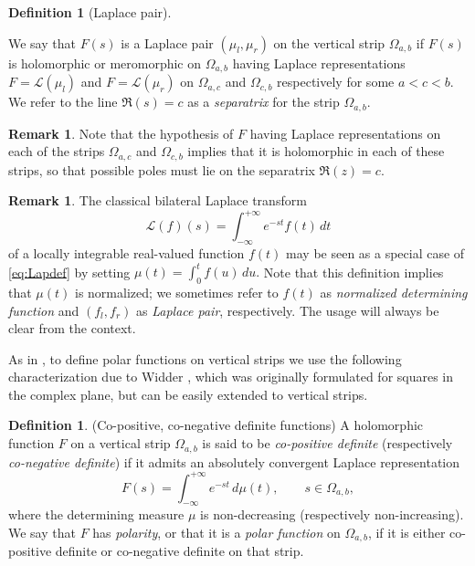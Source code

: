 \documentclass[12pt]{article}
\theoremstyle{definition}
\newtheorem{definition}[theorem]{Definition}
\newtheorem{remark}[theorem]{Remark}
\begin{document}
\begin{definition}[Laplace pair]
\label{def_Laplace_pair}

    We say that $F(s)$ is a Laplace pair $(\mu_l, \mu_r)$ on the vertical strip $\Omega_{a,b}$ if $F(s)$ is holomorphic or meromorphic on $\Omega_{a,b}$ having Laplace representations $F=\mathcal{L}(\mu_l)$ and $F=\mathcal{L}(\mu_r)$ on $\Omega_{a,c}$ and $\Omega_{c,b}$ respectively for some $a<c<b.$ We refer to the line $\Re(s)=c$ as a {\em separatrix} for the strip $\Omega_{a,b}.$
\end{definition}

\begin{remark} \label{rem_polos_na_separatriz}
Note that the hypothesis of $F$ having Laplace representations on each of the strips $\Omega_{a,c}$ and $\Omega_{c,b}$ implies that it is holomorphic in each of these strips, so that possible poles must lie on the separatrix $\Re(z)=c$.
   
\end{remark}

\begin{remark}
    The classical bilateral Laplace transform \begin{equation*}
    \mathcal{L}(f)(s)=\int_{-\infty}^{+ \infty}e^{-st}f(t) \,dt
\end{equation*} of a locally integrable  real-valued 
function $f(t)$ may be seen as a special case of \eqref{eq:Lapdef} by setting $\mu(t)= \int_{0}^{t} f(u) \, du.$ Note that this definition implies that $\mu(t)$ is normalized; we sometimes refer to $f(t)$ as {\em normalized determining function} and $(f_l, f_r)$ as {\em Laplace pair}, respectively.  The usage will always be clear from the context.
\end{remark}

As in \cite{BuescuPolar, BuescuSpecial}, to define polar functions on vertical strips we use the following characterization due to Widder
 \cite{Widder2}, which was originally formulated for squares in the complex plane, but can be easily extended to vertical strips.
\begin{definition}
\label{def_coco}
(Co-positive, co-negative definite functions) 
A holomorphic function \(F\) on a vertical strip \(\Omega_{a,b}\) is said to be \emph{co-positive definite} (respectively \emph{co-negative definite}) if it admits an absolutely convergent Laplace representation
\begin{equation}
    \label{eq_Widder}
F(s)=\int_{-\infty}^{+\infty} e^{-st}\,d\mu(t), \qquad s\in\Omega_{a,b},
\end{equation}
where the determining measure \(\mu\) is non-decreasing (respectively non-increasing). We say that \(F\) has \emph{polarity}, or that it is a \emph{polar function} on \(\Omega_{a,b}\), if it is either co-positive definite or co-negative definite on that strip.
    
\end{definition}
\end{document}
